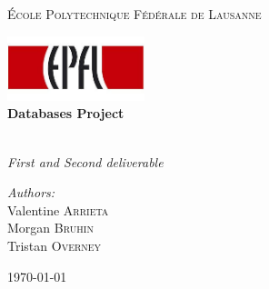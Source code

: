 \begin{titlepage}
\begin{center}


\textsc{\LARGE \'Ecole Polytechnique Fédérale de Lausanne}

\includegraphics[width=0.3\textwidth]{EPFL_logo.jpg}~\\[5cm]

{ \huge \bfseries Databases Project \\[0.4cm] }

\HRule \\[0.4cm]

{ \huge \emph{First and Second deliverable} \\[6cm] }

\noindent
\begin{minipage}{0.4\textwidth}
\begin{center} \large
\emph{Authors:}\\
Valentine \textsc{Arrieta}\\
Morgan \textsc{Bruhin}\\
Tristan \textsc{Overney}

\end{center}
\end{minipage}%


\vfill

{\large \today}

\end{center}
\end{titlepage}